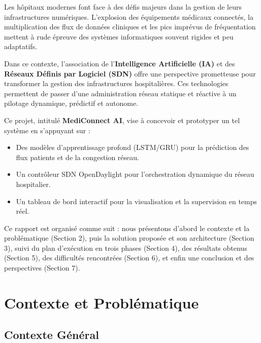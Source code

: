 \documentclass[12pt,a4paper]{article}
\begin{document}
\begin{onehalfspacing}

Les hôpitaux modernes font face à des défis majeurs dans la gestion de leurs infrastructures numériques. L'explosion des équipements médicaux connectés, la multiplication des flux de données cliniques et les pics imprévus de fréquentation mettent à rude épreuve des systèmes informatiques souvent rigides et peu adaptatifs.

Dans ce contexte, l'association de l'\textbf{Intelligence Artificielle (IA)} et des \textbf{Réseaux Définis par Logiciel (SDN)} offre une perspective prometteuse pour transformer la gestion des infrastructures hospitalières. Ces technologies permettent de passer d'une administration réseau statique et réactive à un pilotage dynamique, prédictif et autonome.

Ce projet, intitulé \textbf{MediConnect AI}, vise à concevoir et prototyper un tel système en s'appuyant sur :
\begin{itemize}[leftmargin=1.5cm]
  \item Des modèles d'apprentissage profond (LSTM/GRU) pour la prédiction des flux patients et de la congestion réseau.
  \item Un contrôleur SDN OpenDaylight pour l'orchestration dynamique du réseau hospitalier.
  \item Un tableau de bord interactif pour la visualisation et la supervision en temps réel.
\end{itemize}

Ce rapport est organisé comme suit : nous présentons d'abord le contexte et la problématique (Section 2), puis la solution proposée et son architecture (Section 3), suivi du plan d'exécution en trois phases (Section 4), des résultats obtenus (Section 5), des difficultés rencontrées (Section 6), et enfin une conclusion et des perspectives (Section 7).

\end{onehalfspacing}

\section{Contexte et Problématique}

\subsection{Contexte Général}
\end{document}
